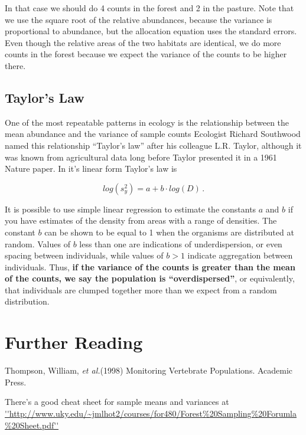 \documentclass[]{book}
\theoremstyle{definition}
\theoremstyle{definition}
\theoremstyle{definition}
\theoremstyle{remark}
\let\BeginKnitrBlock\begin \let\EndKnitrBlock\end
\begin{document}
In that case we should do 4 counts in the forest and 2 in the pasture.
Note that we use the square root of the relative abundances, because the
variance is proportional to abundance, but the allocation equation uses
the standard errors. Even though the relative areas of the two habitats
are identical, we do more counts in the forest because we expect the
variance of the counts to be higher there.

\BeginKnitrBlock{rmdnote}
\hypertarget{taylors-law}{%
\subsection*{Taylor's Law}\label{taylors-law}}

One of the most repeatable patterns in ecology is the relationship
between the mean abundance and the variance of sample counts Ecologist
Richard Southwood named this relationship ``Taylor's law'' after his
colleague L.R. Taylor, although it was known from agricultural data long
before Taylor presented it in a 1961 Nature paper. In it's linear form
Taylor's law is

\[
  log\left(s_y^2\right) = a + b \cdot log\left(D\right)\,.
\]

It is possible to use simple linear regression to estimate the constants
\(a\) and \(b\) if you have estimates of the density from areas with a
range of densities. The constant \(b\) can be shown to be equal to 1
when the organisms are distributed at random. Values of \(b\) less than
one are indications of underdispersion, or even spacing between
individuals, while values of \(b > 1\) indicate aggregation between
individuals. Thus, \textbf{if the variance of the counts is greater than
the mean of the counts, we say the population is ``overdispersed''}, or
equivalently, that individuals are clumped together more than we expect
from a random distribution.
\EndKnitrBlock{rmdnote}

\hypertarget{further-reading}{%
\section*{Further Reading}\label{further-reading}}

Thompson, William, \emph{et al.}(1998) Monitoring Vertebrate
Populations. Academic Press.

There's a good cheat sheet for sample means and variances at
\url{''http://www.uky.edu/~jmlhot2/courses/for480/Forest\%20Sampling\%20Forumla\%20Sheet.pdf''}
\end{document}
